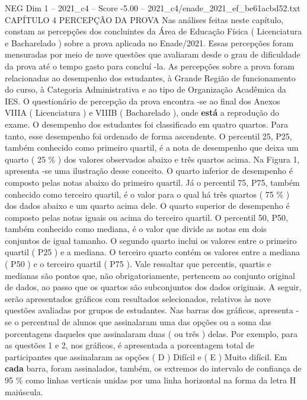 \begin{textsample}{NEG Dim 1 – 2021\_c4 – Score -5.00 – 2021\_c4/enade\_2021\_ef\_be61acbd52.txt}  \label{ex:f1_neg_064}
CAPÍTULO 4 PERCEPÇÃO DA PROVA Nas análises feitas neste capítulo, constam as percepções dos concluintes da Área de Educação Física ( Licenciatura e Bacharelado ) sobre a prova aplicada no Enade/2021.
Essas percepções foram mensuradas por meio de nove questões que avaliaram desde o grau de dificuldade da prova até o tempo gasto para concluí -la.
As percepções sobre a prova foram relacionadas ao desempenho dos estudantes, à Grande Região de funcionamento do curso, à Categoria Administrativa e ao tipo de Organização Acadêmica da IES.
O questionário de percepção da prova encontra -se ao final dos Anexos VIIIA ( Licenciatura ) e VIIIB ( Bacharelado ), onde \textbf{está} a reprodução do exame.
O desempenho dos estudantes foi classificado em quatro quartos.
Para tanto, esse desempenho foi ordenado de forma ascendente.
O percentil 25, P25, também conhecido como primeiro quartil, é a nota de desempenho que deixa um quarto ( 25 \% ) dos valores observados abaixo e três quartos acima.
Na Figura 1, apresenta -se uma ilustração desse conceito.
O quarto inferior de desempenho é composto pelas notas abaixo do primeiro quartil.
Já o percentil 75, P75, também conhecido como terceiro quartil, é o valor para o qual há três quartos ( 75 \% ) dos dados abaixo e um quarto acima dele.
O quarto superior de desempenho é composto pelas notas iguais ou acima do terceiro quartil.
O percentil 50, P50, também conhecido como mediana, é o valor que divide as notas em dois conjuntos de igual tamanho.
O segundo quarto inclui os valores entre o primeiro quartil ( P25 ) e a mediana.
O terceiro quarto contém os valores entre a mediana ( P50 ) e o terceiro quartil ( P75 ).
Vale ressaltar que percentis, quartis e medianas são pontos que, não obrigatoriamente, pertencem ao conjunto original de dados, ao passo que os quartos são subconjuntos dos dados originais.
A seguir, serão apresentados gráficos com resultados selecionados, relativos às nove questões avaliadas por grupos de estudantes.
Nas barras dos gráficos, apresenta -se o percentual de alunos que assinalaram uma das opções ou a soma das porcentagens daqueles que assinalaram duas ( ou três ) delas.
Por exemplo, para as questões 1 e 2, nos gráficos, é apresentada a porcentagem total de participantes que assinalaram as opções ( D ) Difícil e ( E ) Muito difícil.
Em \textbf{cada} barra, foram assinalados, também, os extremos do intervalo de confiança de 95 \% como linhas verticais unidas por uma linha horizontal na forma da letra H maiúscula.

\end{textsample}
